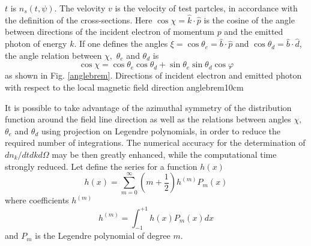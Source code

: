 $t$ is $n_s\left( t,\psi\right) .$ The velovity $v$ is the velocity of test
partcles, in accordance with the definition of the cross-sections. Here $%
\cos\chi=\widehat{k}\cdot\widehat{p}$ is the cosine of the angle between
directions of the incident electron of momentum $p$ and the emitted photon
of energy $k$. If one defines the angles $\xi=\cos\theta_e=\widehat{b}\cdot%
\widehat{p}$ and $\cos\theta_d=\widehat{b}\cdot\widehat{d}$, the angle
relation between $\chi,$ $\theta_e$ and $\theta_d$ is
\begin{equation}
\cos\chi=\cos\theta_{e}\cos\theta_{d}+\sin\theta_{e}\sin\theta_{d}\cos\varphi
\end{equation}
as shown in Fig. \ref{anglebrem}.
 {Directions of incident electron and emitted photon with respect to the local magnetic field direction} {anglebrem}{10cm} %

It is possible to take advantage of the azimuthal symmetry of the
distribution function around the field line direction as well as the
relations between angles $\chi ,$ $\theta _{e}$ and $\theta _{d}$ using
projection on Legendre polynomials, in order to reduce the required number
of integrations. The numerical accuracy for the determination of $%
dn_{k}/dtdkd\Omega $ may be then greatly enhanced, while the computational
time strongly reduced. Let define the series for a function $h\left(
x\right) $%
\begin{equation}
h\left( x\right) =\sum_{m=0}^{\infty }\left( m+\frac{1}{2}\right) h^{\left(
m\right) }P_{m}\left( x\right)
\end{equation}
where coefficients $h^{\left( m\right) }$%
\begin{equation}
h^{\left( m\right) }=\int_{-1}^{+1}h\left( x\right) P_{m}\left( x\right) dx
\end{equation}
and $P_{m}$ is the Legendre polynomial of degree $m$.

